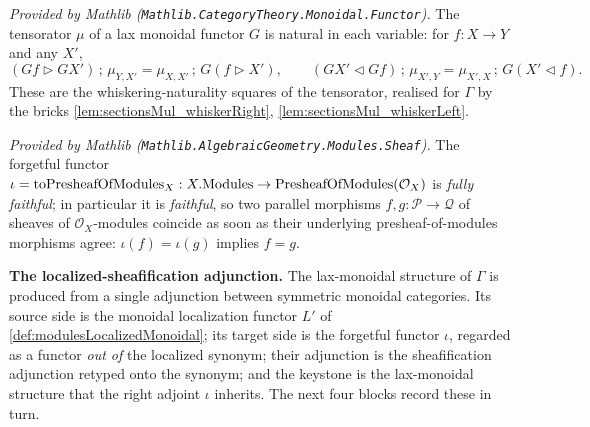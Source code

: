 \begin{lemma}
  \label{lem:laxMonoidal_mu_natural_mathlib}
  \mathlibok
  \textit{Provided by Mathlib (\texttt{Mathlib.CategoryTheory.Monoidal.Functor}).}
  The tensorator \(\mu\) of a lax monoidal functor \(G\) is natural in each
  variable: for \(f : X \to Y\) and any \(X'\),
  \[
    (G f \rhd G X') \,;\, \mu_{Y, X'} = \mu_{X, X'} \,;\, G(f \rhd X'),
    \qquad
    (G X' \lhd G f) \,;\, \mu_{X', Y} = \mu_{X', X} \,;\, G(X' \lhd f).
  \]
  These are the whiskering-naturality squares of the tensorator, realised for
  \(\Gamma\) by the bricks \cref{lem:sectionsMul_whiskerRight},
  \cref{lem:sectionsMul_whiskerLeft}.
\end{lemma}

\begin{lemma}
  \label{lem:toPresheafOfModules_faithful_mathlib}
  \mathlibok
  \textit{Provided by Mathlib
  (\texttt{Mathlib.AlgebraicGeometry.Modules.Sheaf}).}
  The forgetful functor
  \(\iota = \mathrm{toPresheafOfModules}_X : X.\mathrm{Modules} \to \mathrm{PresheafOfModules}(\mathcal{O}_X)\)
  is \emph{fully faithful}; in particular it is \emph{faithful}, so two parallel
  morphisms \(f, g : \mathcal{P} \to \mathcal{Q}\) of sheaves of
  \(\mathcal{O}_X\)-modules coincide as soon as their underlying
  presheaf-of-modules morphisms agree: \(\iota(f) = \iota(g)\) implies \(f = g\).
\end{lemma}

\medskip
\noindent\textbf{The localized-sheafification adjunction.}
The lax-monoidal structure of \(\Gamma\) is produced from a single adjunction
between symmetric monoidal categories. Its source side is the monoidal
localization functor \(L'\) of \cref{def:modulesLocalizedMonoidal}; its target side
is the forgetful functor \(\iota\), regarded as a functor \emph{out of} the
localized synonym; their adjunction is the sheafification adjunction retyped onto
the synonym; and the keystone is the lax-monoidal structure that the right adjoint
\(\iota\) inherits. The next four blocks record these in turn.

